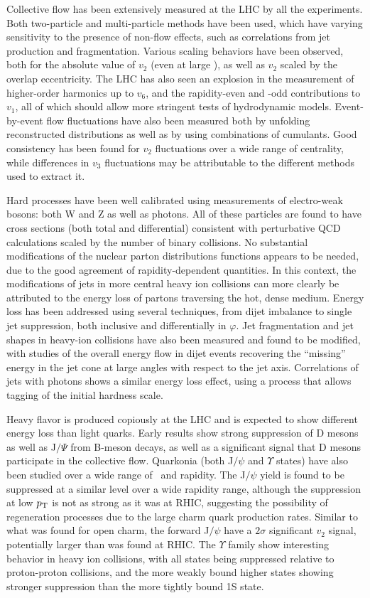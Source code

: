 Collective flow has been extensively measured at the LHC by all the experiments.
Both two-particle and multi-particle methods have been used, which have varying sensitivity to
the presence of non-flow effects, such as correlations from jet production and fragmentation.
Various scaling behaviors have been observed, both for the absolute value of $v_2$ (even at
large \pT), as well as $v_2$ scaled by the overlap eccentricity.
The LHC has also seen an explosion in the measurement of higher-order harmonics up to $v_6$,
and the rapidity-even and -odd contributions to $v_1$, all of which should
allow more stringent tests of hydrodynamic models.
Event-by-event flow fluctuations have also been measured both by unfolding reconstructed
distributions as well as by using combinations of cumulants.  Good consistency has been found
for $v_2$ fluctuations over a wide range of centrality, while differences in $v_3$
fluctuations may be attributable to the different methods used to extract it.

Hard processes have been well calibrated using measurements of electro-weak bosons: both
W and Z as well as photons.  All of these particles are found to have cross sections
(both total and differential)
consistent with perturbative QCD calculations scaled by the number of binary collisions.
No substantial modifications of the nuclear parton distributions functions appears to be needed, due to the good
agreement of rapidity-dependent quantities.
In this context, the modifications of jets in more central heavy ion collisions can more
clearly be attributed to the energy loss of partons traversing the hot, dense medium.
Energy loss has been addressed using several techniques, from dijet imbalance 
to single jet suppression, both inclusive and differentially in $\varphi$.  Jet fragmentation and 
jet shapes in heavy-ion collisions have also been measured and found to be modified, with
studies of the overall energy flow in dijet events recovering the ``missing'' energy in
the jet cone at large angles with respect to the jet axis.
Correlations of jets with photons shows a similar energy loss effect, using a process that allows
tagging of the initial hardness scale.

Heavy flavor is produced copiously at the LHC and is expected to show different energy loss than
light quarks.  Early results show strong suppression of D mesons as well as J$/\Psi$ from
B-meson decays, as well as a significant signal that D mesons participate in the collective flow.
Quarkonia (both J$/\psi$ and $\Upsilon$ states) have also been studied over a wide range of \pT\
and rapidity.  The J$/\psi$ yield is found to be suppressed at a similar level over a wide
rapidity range, although the suppression at low $\mbox{$p_{\mathrm{T}}$}$ is not as strong as it was at
RHIC, suggesting the possibility of regeneration processes due to the large charm quark production
rates.  Similar to what was found for open charm, the forward J$/\psi$ have a
$2\sigma$ significant $v_2$ signal, potentially larger than was found at RHIC.
The $\Upsilon$ family show interesting behavior in heavy ion collisions, with all states being
suppressed relative to proton-proton collisions, and the more weakly bound higher states showing
stronger suppression than the more tightly bound 1S state.

